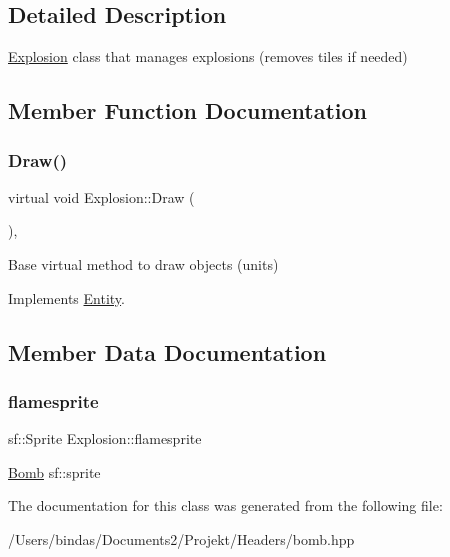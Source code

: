 \subsection{Detailed Description}
\mbox{\hyperlink{class_explosion}{Explosion}} class that manages explosions (removes tiles if needed) 

\subsection{Member Function Documentation}
\mbox{\label{class_explosion_a7c63ca80a8b15f581302be57342ce329}} 
\subsubsection{\texorpdfstring{Draw()}{Draw()}}
{\footnotesize\ttfamily virtual void Explosion\+::\+Draw (\begin{DoxyParamCaption}{ }\end{DoxyParamCaption})\hspace{0.3cm}{\ttfamily [override]}, {\ttfamily [virtual]}}

Base virtual method to draw objects (units) 

Implements \mbox{\hyperlink{class_entity_a1d006ae3028ba4ddfc9b4f202ccddf55}{Entity}}.



\subsection{Member Data Documentation}
\mbox{\label{class_explosion_ae32b96888c43e2a1adfb61c3b6baa2a4}} 
\subsubsection{\texorpdfstring{flamesprite}{flamesprite}}
{\footnotesize\ttfamily sf\+::\+Sprite Explosion\+::flamesprite\hspace{0.3cm}{\ttfamily [private]}}

\mbox{\hyperlink{class_bomb}{Bomb}} sf\+::sprite 

The documentation for this class was generated from the following file\+:\begin{DoxyCompactItemize}
\item 
/\+Users/bindas/\+Documents2/\+Projekt/\+Headers/bomb.\+hpp\end{DoxyCompactItemize}
